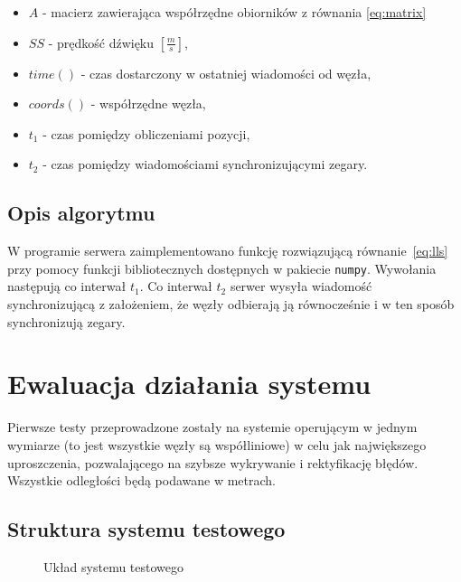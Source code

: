 \begin{itemize}
    \item $A$ - macierz zawierająca współrzędne obiorników z równania \ref{eq:matrix}
    \item $SS$ {-} prędkość dźwięku $\left[\frac{m}{s}\right]$,
    \item $time()$ {-} czas dostarczony w ostatniej wiadomości od węzła,
    \item $coords()$ {-} współrzędne węzła,
    \item $t_1$ {-} czas pomiędzy obliczeniami pozycji,
    \item $t_2$ {-} czas pomiędzy wiadomościami synchronizującymi zegary.
\end{itemize}

\subsection{Opis algorytmu}

W programie serwera zaimplementowano funkcję rozwiązującą równanie~\ref{eq:lls} przy pomocy funkcji bibliotecznych dostępnych w pakiecie \texttt{numpy}. Wywołania następują co interwał $t_1$. Co interwał $t_2$ serwer wysyła wiadomość synchronizującą z założeniem, że węzły odbierają ją równocześnie i w ten sposób synchronizują zegary.

\section{Ewaluacja działania systemu}

Pierwsze testy przeprowadzone zostały na systemie operującym w jednym wymiarze (to jest wszystkie węzły są współliniowe) w celu jak największego uproszczenia, pozwalającego na szybsze wykrywanie i rektyfikację błędów. Wszystkie odległości będą podawane w metrach.

\subsection{Struktura systemu testowego}

\begin{figure}[h]
    \centering
    \caption{Układ systemu testowego}
\label{fig:test_setup}
\end{figure}

